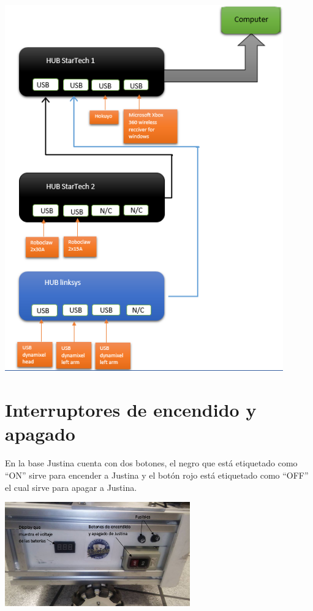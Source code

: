 \documentclass[user_manual.tex]{subfiles}
\begin{document}
\begin{center}
\includegraphics[width=0.9\textwidth]{Figures/Hardware/Diagramas/HUB.png}
\label{fig:Hardware:Diagramas:Justina:HUBs}
\end{center}


\section{Interruptores de encendido y apagado}

En la base Justina cuenta con dos botones, el negro que está etiquetado como ``ON'' sirve para encender a Justina y el botón
rojo está etiquetado como ``OFF'' el cual sirve para apagar a Justina.\\

\begin{center}
\includegraphics[width=0.6\textwidth]{Figures/Hardware/Diagramas/Encendido.png}
\label{fig:Hardware:Diagramas:Justina:Encendido}
\end{center}
\end{document}
